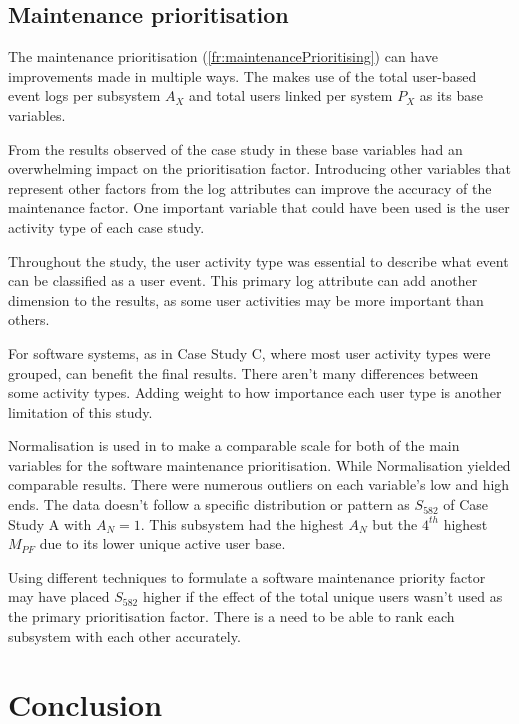 \subsection{Maintenance prioritisation}
The maintenance prioritisation (\ref{fr:maintenancePrioritising}) can have improvements made in
multiple ways. The
 makes use
of the total user-based event logs per subsystem $A_X$ and total users linked per system $P_X$ as
its base variables.\par From the results observed of the case study in 
these base variables had an overwhelming impact on the prioritisation factor. Introducing other
variables that represent other factors from the log attributes can improve the accuracy of the
maintenance factor. One important variable that could have been used is the user activity type of
each case study.\par Throughout the study, the user activity type was essential to describe what
event can be classified as a user event. This primary log attribute can add another dimension to the
results, as some user activities may be more important than others. \par For software systems, as in
Case Study C, where most user activity types were grouped, can benefit the final results. There aren't many differences between some activity types. Adding weight to
how importance each user type is another limitation of this study.\par Normalisation is used in
 to make a
comparable scale for both of the main variables for the software maintenance prioritisation. While
Normalisation yielded comparable results. There were numerous outliers on each variable's low and
high ends. The data doesn't follow a specific distribution or pattern as $S_{582}$ of Case Study A
with $A_N=1$. This subsystem had the highest $A_N$ but the $4^{th}$ highest $M_{PF}$ due to its
lower unique active user base.\par Using different techniques to formulate a software maintenance
priority factor may have placed $S_{582}$ higher if the effect of the total unique users wasn't used
as the primary prioritisation factor. There is a need to be able to rank each subsystem with each
other accurately.

\section{Conclusion}

